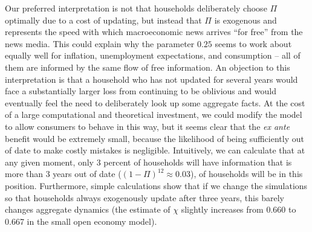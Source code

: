 \documentclass[titlepage]{\econtex}
\begin{document}
Our preferred interpretation is not that households deliberately choose $\Pi$ optimally due to a cost of updating, but instead that $\Pi$ is exogenous and represents the speed with which macroeconomic news arrives ``for free'' from the news media.  This could explain why the parameter $0.25$ seems to work about equally well for inflation, unemployment expectations, and consumption -- all of them are informed by the same flow of free information. An objection to this interpretation is that a household who has not updated for several years would face a substantially larger loss from continuing to be oblivious and would eventually feel the need to deliberately look up some aggregate facts.  At the cost of a large computational and theoretical investment, we could modify the model to allow consumers to behave in this way, but it seems clear that the {\it ex ante} benefit would be extremely small, because the likelihood of being sufficiently out of date to make costly mistakes is negligible.  Intuitively, we can calculate that at any given moment, only 3 percent of households will have information that is more than 3 years out of date ($(1-\Pi)^{12} \approx 0.03$), of households will be in this position.  Furthermore, simple calculations show that if we change the simulations so that households always exogenously update after three years, this barely changes aggregate dynamics (the estimate of $\chi$ slightly increases from 0.660 to 0.667 in the small open economy model).
\end{document}

